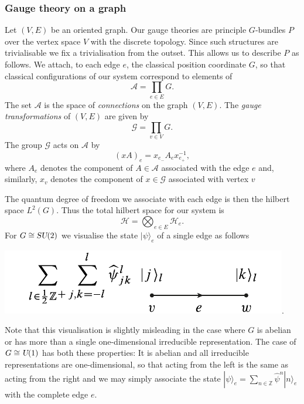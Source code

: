 \documentclass[12pt]{amsart}
\def\su2{\textsl{SU}(2)}
\def\uone{\textsl{U}(1)}
\theoremstyle{definition}
\theoremstyle{remark}
\numberwithin{equation}{section}
\begin{document}
\subsubsection{Gauge theory on a graph}
Let $(V,E)$ be an oriented graph. Our gauge theories are principle $G$-bundles $P$ over the vertex space $V$ with the discrete topology. Since such structures are trivialisable we fix a trivialisation from the outset. This allows us to describe $P$ as follows. We attach, to each edge $e$, the classical position coordinate $G$, so that classical configurations of our system correspond to elements of
\begin{equation}
	\mathcal{A} = \prod_{e\in E} G.
\end{equation}
The set $\mathcal{A}$ is the space of \emph{connections} on the graph $(V,E)$. The \emph{gauge transformations} of $(V,E)$ are given by
\begin{equation}
	\mathcal{G} = \prod_{v\in V} G.
\end{equation}
The group $\mathcal{G}$ acts on $\mathcal{A}$ by
\begin{equation}
	(xA)_e = x_{e_-} A_e x_{e_+}^{-1},
\end{equation}
where $A_e$ denotes the component of $A \in \mathcal{A}$ associated with the edge $e$ and, similarly, $x_v$ denotes the component of $x\in \mathcal{G}$ associated with vertex $v$ 


The quantum degree of freedom we associate with each edge is then the hilbert space $L^2(G)$. Thus the total hilbert space for our system is
\begin{equation}
	\mathcal{H} = \bigotimes_{e\in E} \mathcal{H}_e.
\end{equation}
For $G \cong \su2$ we visualise the state $|\psi\rangle_e$ of a single edge as follows
\begin{center}
	\includegraphics{edgespace.pdf}.
\end{center}
Note that this visualisation is slightly misleading in the case where $G$ is 
abelian or has more than a single one-dimensional irreducible representation.
The case of $G \cong \uone$ has both these properties: It is abelian and all
irreducible representations are one-dimensional, so that 
acting from the left is the same as acting from the right and we 
may simply associate the state 
$|\psi\rangle_e = \sum_{n\in \mathbb{Z}} \widehat{\psi}^n |n\rangle_e$
with the complete edge $e$.
\end{document}
